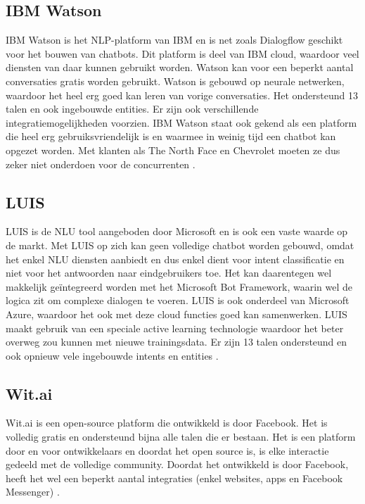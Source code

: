 \subsection{IBM Watson}
\label{subsec:nlp-platformen-ibm-watson}

IBM Watson is het NLP-platform van IBM en is net zoals Dialogflow geschikt voor het bouwen van chatbots. Dit platform is deel van IBM cloud, waardoor veel diensten van daar kunnen gebruikt worden. Watson kan voor een beperkt aantal conversaties gratis worden gebruikt. Watson is gebouwd op neurale netwerken, waardoor het heel erg goed kan leren van vorige conversaties. Het ondersteund 13 talen en ook ingebouwde entities. Er zijn ook verschillende integratiemogelijkheden voorzien. IBM Watson staat ook gekend als een platform die heel erg gebruiksvriendelijk is en waarmee in weinig tijd een chatbot kan opgezet worden. Met klanten als The North Face en Chevrolet moeten ze dus zeker niet onderdoen voor de concurrenten \autocite{IBM2020}.


\subsection{LUIS}
\label{subsec:nlp-platformen-luis} 

LUIS is de NLU tool aangeboden door Microsoft en is ook een vaste waarde op de markt. Met LUIS op zich kan geen volledige chatbot worden gebouwd, omdat het enkel NLU diensten aanbiedt en dus enkel dient voor intent classificatie en niet voor het antwoorden naar eindgebruikers toe.  Het kan daarentegen wel makkelijk geïntegreerd worden met het Microsoft Bot Framework, waarin wel de logica zit om complexe dialogen te voeren. LUIS is ook onderdeel van Microsoft Azure, waardoor het ook met deze cloud functies goed kan samenwerken. LUIS maakt gebruik van een speciale active learning technologie waardoor het beter overweg zou kunnen met nieuwe trainingsdata. Er zijn 13 talen ondersteund en ook opnieuw vele ingebouwde intents en entities \autocite{LUIS2020}.

\subsection{Wit.ai}
\label{subsec:nlp-platformen-wit.ai}

Wit.ai is een open-source platform die ontwikkeld is door Facebook. Het is volledig gratis en ondersteund bijna alle talen die er bestaan. Het is een platform door en voor ontwikkelaars en doordat het open source is, is elke interactie gedeeld met de volledige community. Doordat het ontwikkeld is door Facebook, heeft het wel een beperkt aantal integraties (enkel websites, apps en Facebook Messenger) \autocite{Wit2020}.

